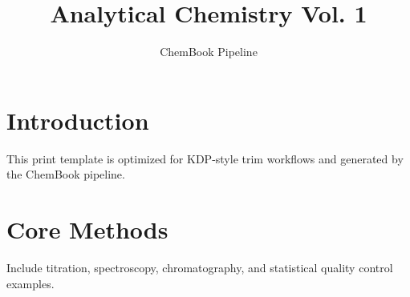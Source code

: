 \documentclass[12pt]{book}
\title{Analytical Chemistry Vol. 1}
\author{ChemBook Pipeline}
\begin{document}
\maketitle
\tableofcontents
\chapter{Introduction}
This print template is optimized for KDP-style trim workflows and generated by the ChemBook pipeline.
\chapter{Core Methods}
Include titration, spectroscopy, chromatography, and statistical quality control examples.
\end{document}
